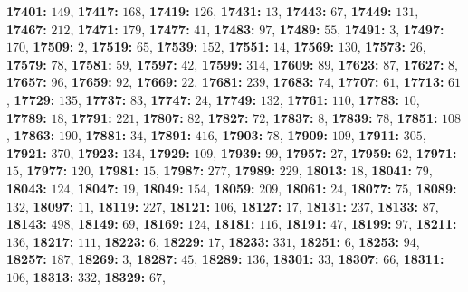 \textsf{\bfseries 17401:} $149$, \textsf{\bfseries 17417:} $168$, \textsf{\bfseries 17419:} $126$, \textsf{\bfseries 17431:} $13$, \textsf{\bfseries 17443:} $67$, \textsf{\bfseries 17449:} $131$, \textsf{\bfseries 17467:} $212$, \textsf{\bfseries 17471:} $179$, \textsf{\bfseries 17477:} $41$, \textsf{\bfseries 17483:} $97$, \textsf{\bfseries 17489:} $55$, \textsf{\bfseries 17491:} $3$, \textsf{\bfseries 17497:} $170$, \textsf{\bfseries 17509:} $2$, \textsf{\bfseries 17519:} $65$, \textsf{\bfseries 17539:} $152$, \textsf{\bfseries 17551:} $14$, \textsf{\bfseries 17569:} $130$, \textsf{\bfseries 17573:} $26$, \textsf{\bfseries 17579:} $78$, \textsf{\bfseries 17581:} $59$, \textsf{\bfseries 17597:} $42$, \textsf{\bfseries 17599:} $314$, \textsf{\bfseries 17609:} $89$, \textsf{\bfseries 17623:} $87$, \textsf{\bfseries 17627:} $8$, \textsf{\bfseries 17657:} $96$, \textsf{\bfseries 17659:} $92$, \textsf{\bfseries 17669:} $22$, \textsf{\bfseries 17681:} $239$, \textsf{\bfseries 17683:} $74$, \textsf{\bfseries 17707:} $61$, \textsf{\bfseries 17713:} $61$, \textsf{\bfseries 17729:} $135$, \textsf{\bfseries 17737:} $83$, \textsf{\bfseries 17747:} $24$, \textsf{\bfseries 17749:} $132$, \textsf{\bfseries 17761:} $110$, \textsf{\bfseries 17783:} $10$, \textsf{\bfseries 17789:} $18$, \textsf{\bfseries 17791:} $221$, \textsf{\bfseries 17807:} $82$, \textsf{\bfseries 17827:} $72$, \textsf{\bfseries 17837:} $8$, \textsf{\bfseries 17839:} $78$, \textsf{\bfseries 17851:} $108$, \textsf{\bfseries 17863:} $190$, \textsf{\bfseries 17881:} $34$, \textsf{\bfseries 17891:} $416$, \textsf{\bfseries 17903:} $78$, \textsf{\bfseries 17909:} $109$, \textsf{\bfseries 17911:} $305$, \textsf{\bfseries 17921:} $370$, \textsf{\bfseries 17923:} $134$, \textsf{\bfseries 17929:} $109$, \textsf{\bfseries 17939:} $99$, \textsf{\bfseries 17957:} $27$, \textsf{\bfseries 17959:} $62$, \textsf{\bfseries 17971:} $15$, \textsf{\bfseries 17977:} $120$, \textsf{\bfseries 17981:} $15$, \textsf{\bfseries 17987:} $277$, \textsf{\bfseries 17989:} $229$, \textsf{\bfseries 18013:} $18$, \textsf{\bfseries 18041:} $79$, \textsf{\bfseries 18043:} $124$, \textsf{\bfseries 18047:} $19$, \textsf{\bfseries 18049:} $154$, \textsf{\bfseries 18059:} $209$, \textsf{\bfseries 18061:} $24$, \textsf{\bfseries 18077:} $75$, \textsf{\bfseries 18089:} $132$, \textsf{\bfseries 18097:} $11$, \textsf{\bfseries 18119:} $227$, \textsf{\bfseries 18121:} $106$, \textsf{\bfseries 18127:} $17$, \textsf{\bfseries 18131:} $237$, \textsf{\bfseries 18133:} $87$, \textsf{\bfseries 18143:} $498$, \textsf{\bfseries 18149:} $69$, \textsf{\bfseries 18169:} $124$, \textsf{\bfseries 18181:} $116$, \textsf{\bfseries 18191:} $47$, \textsf{\bfseries 18199:} $97$, \textsf{\bfseries 18211:} $136$, \textsf{\bfseries 18217:} $111$, \textsf{\bfseries 18223:} $6$, \textsf{\bfseries 18229:} $17$, \textsf{\bfseries 18233:} $331$, \textsf{\bfseries 18251:} $6$, \textsf{\bfseries 18253:} $94$, \textsf{\bfseries 18257:} $187$, \textsf{\bfseries 18269:} $3$, \textsf{\bfseries 18287:} $45$, \textsf{\bfseries 18289:} $136$, \textsf{\bfseries 18301:} $33$, \textsf{\bfseries 18307:} $66$, \textsf{\bfseries 18311:} $106$, \textsf{\bfseries 18313:} $332$, \textsf{\bfseries 18329:} $67$, 
